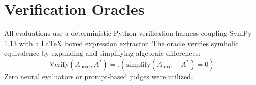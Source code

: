 \documentclass{article}
\begin{document}
\section{Verification Oracles}
All evaluations use a deterministic Python verification harness coupling SymPy 1.13 with a LaTeX boxed expression extractor. The oracle verifies symbolic equivalence by expanding and simplifying algebraic differences:
\begin{equation}
\text{Verify}(A_{\text{pred}}, A^*) = \mathbb{I}\left(\text{simplify}(A_{\text{pred}} - A^*) = 0\right)
\end{equation}
Zero neural evaluators or prompt-based judges were utilized.
\end{document}
